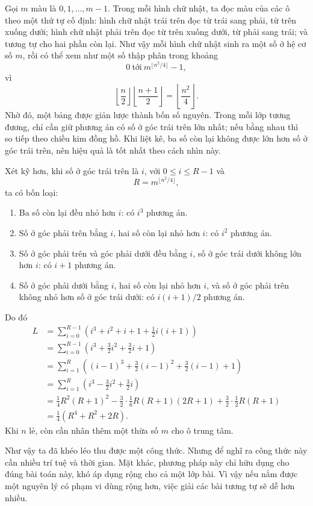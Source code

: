 \documentclass[11pt]{article}
\begin{document}
Gọi \(m\) màu là \(0,1,\ldots,m-1\). Trong mỗi hình chữ nhật, ta đọc màu của
các ô theo một thứ tự cố định: hình chữ nhật trái trên đọc từ trái sang phải,
từ trên xuống dưới; hình chữ nhật phải trên đọc từ trên xuống dưới, từ phải
sang trái; và tương tự cho hai phần còn lại. Như vậy mỗi hình chữ nhật sinh
ra một số ở hệ cơ số \(m\), rồi có thể xem như một số thập phân trong khoảng
\[
  0\ \text{tới}\ m^{\lfloor n^2/4\rfloor}-1,
\]
vì
\[
  \left\lfloor\frac n2\right\rfloor
  \left\lfloor\frac{n+1}{2}\right\rfloor
  =\left\lfloor\frac{n^2}{4}\right\rfloor.
\]
Nhờ đó, một bảng được giản lược thành bốn số nguyên. Trong mỗi lớp tương
đương, chỉ cần giữ phương án có số ở góc trái trên lớn nhất; nếu bằng nhau
thì so tiếp theo chiều kim đồng hồ. Khi liệt kê, ba số còn lại không được lớn
hơn số ở góc trái trên, nên hiệu quả là tốt nhất theo cách nhìn này.

Xét kỹ hơn, khi số ở góc trái trên là \(i\), với \(0\le i\le R-1\) và
\[
  R=m^{\lfloor n^2/4\rfloor},
\]
ta có bốn loại:
\begin{enumerate}
  \item Ba số còn lại đều nhỏ hơn \(i\): có \(i^3\) phương án.
  \item Số ở góc phải trên bằng \(i\), hai số còn lại nhỏ hơn \(i\): có
  \(i^2\) phương án.
  \item Số ở góc phải trên và góc phải dưới đều bằng \(i\), số ở góc trái
  dưới không lớn hơn \(i\): có \(i+1\) phương án.
  \item Số ở góc phải dưới bằng \(i\), hai số còn lại nhỏ hơn \(i\), và số ở
  góc phải trên không nhỏ hơn số ở góc trái dưới: có \(i(i+1)/2\) phương án.
\end{enumerate}
Do đó
\[
\begin{aligned}
L
&=\sum_{i=0}^{R-1}\left(i^3+i^2+i+1+\frac12 i(i+1)\right)\\
&=\sum_{i=0}^{R-1}\left(i^3+\frac32 i^2+\frac32 i+1\right)\\
&=\sum_{i=1}^{R}\left((i-1)^3+\frac32(i-1)^2+\frac32(i-1)+1\right)\\
&=\sum_{i=1}^{R}\left(i^3-\frac32 i^2+\frac32 i\right)\\
&=\frac14 R^2(R+1)^2-\frac32\cdot\frac16R(R+1)(2R+1)
  +\frac32\cdot\frac12R(R+1)\\
&=\frac14\left(R^4+R^2+2R\right).
\end{aligned}
\]
Khi \(n\) lẻ, còn cần nhân thêm một thừa số \(m\) cho ô trung tâm.

Như vậy ta đã khéo léo thu được một công thức. Nhưng để nghĩ ra công thức
này cần nhiều trí tuệ và thời gian. Mặt khác, phương pháp này chỉ hữu dụng
cho đúng bài toán này, khó áp dụng rộng cho cả một lớp bài. Vì vậy nếu nắm
được một nguyên lý có phạm vi dùng rộng hơn, việc giải các bài tương tự sẽ
dễ hơn nhiều.
\end{document}

